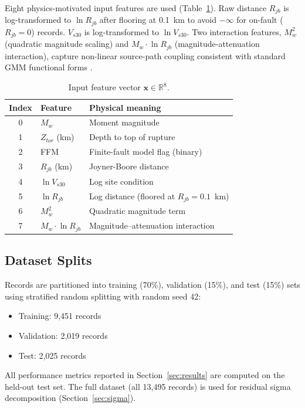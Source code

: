 \documentclass[12pt,a4paper]{article}
\begin{document}
Eight physics-motivated input features are used (Table~\ref{tab:features}).
Raw distance $R_{jb}$ is log-transformed to $\ln R_{jb}$ after flooring at
0.1~km to avoid $-\infty$ for on-fault ($R_{jb}=0$) records.
$V_{s30}$ is log-transformed to $\ln V_{s30}$.
Two interaction features, $M_w^2$ (quadratic magnitude scaling) and
$M_w \cdot \ln R_{jb}$ (magnitude-attenuation interaction), capture non-linear
source-path coupling consistent with standard GMM functional forms
\citep{Boore2014,Abrahamson2016}.

\begin{table}[htbp]
\centering
\caption{Input feature vector $\mathbf{x} \in \mathbb{R}^8$.}
\label{tab:features}
\footnotesize
\renewcommand{\arraystretch}{1.15}
\begin{tabular}{cll}
\toprule
Index & Feature & Physical meaning \\
\midrule
0 & $M_w$ & Moment magnitude \\
1 & $Z_{tor}$ (km) & Depth to top of rupture \\
2 & FFM & Finite-fault model flag (binary) \\
3 & $R_{jb}$ (km) & Joyner-Boore distance \\
4 & $\ln V_{s30}$ & Log site condition \\
5 & $\ln R_{jb}$ & Log distance (floored at $R_{jb}=0.1$~km) \\
6 & $M_w^2$ & Quadratic magnitude term \\
7 & $M_w \cdot \ln R_{jb}$ & Magnitude--attenuation interaction \\
\bottomrule
\end{tabular}
\end{table}

\subsection{Dataset Splits}
\label{sec:splits}

Records are partitioned into training (70\%), validation (15\%), and test (15\%)
sets using stratified random splitting with random seed 42:
\begin{itemize}[leftmargin=*]
  \item Training: 9{,}451 records
  \item Validation: 2{,}019 records
  \item Test: 2{,}025 records
\end{itemize}
All performance metrics reported in Section~\ref{sec:results} are computed on
the held-out test set.
The full dataset (all 13{,}495 records) is used for residual sigma decomposition
(Section~\ref{sec:sigma}).
\end{document}
